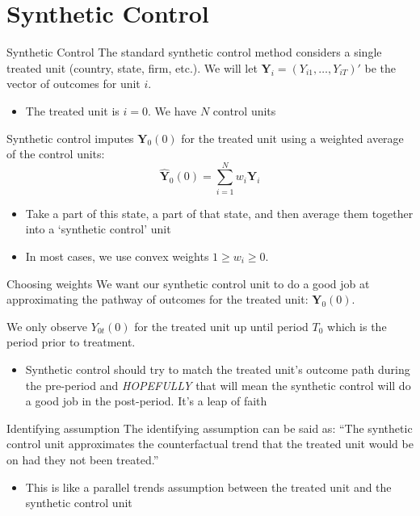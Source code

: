 \documentclass[aspectratio=169,t,11pt,table]{beamer}
\begin{document}
\section{Synthetic Control}

\begin{frame}{Synthetic Control}
  The standard synthetic control method considers a single treated unit (country, state, firm, etc.). We will let $\bm{Y}_i = \left( Y_{i1}, \dots, Y_{iT} \right)'$ be the vector of outcomes for unit $i$. 
  \begin{itemize}
    \item The treated unit is $i = 0$. We have $N$ control units
  \end{itemize}

  \bigskip\pause
  Synthetic control imputes $\bm{Y}_0(0)$ for the treated unit using a weighted average of the control units: 
  $$
    \hat{\bm{Y}}_0(0) = \sum_{i = 1}^N w_i \bm{Y}_i
  $$
  \begin{itemize}
    \item Take a part of this state, a part of that state, and then average them together into a `synthetic control' unit
    \item In most cases, we use convex weights $1 \geq w_i \geq 0$.
  \end{itemize}
\end{frame}


\begin{frame}{Choosing weights}
  We want our synthetic control unit to do a good job at approximating the pathway of outcomes for the treated unit: $\bm{Y}_0(0)$.

  \pause
  \bigskip
  We only observe $Y_{0t}(0)$ for the treated unit up until period $T_0$ which is the period prior to treatment. 
  \begin{itemize}
    \item Synthetic control should try to match the treated unit's outcome path during the pre-period and \emph{HOPEFULLY} that will mean the synthetic control will do a good job in the post-period. It's a leap of faith
  \end{itemize}
\end{frame}

\begin{frame}{Identifying assumption}
  The identifying assumption can be said as:
  ``The synthetic control unit approximates the counterfactual trend that the treated unit would be on had they not been treated.''

  \begin{itemize}
    \item This is like a parallel trends assumption between the treated unit and the synthetic control unit
  \end{itemize}
\end{frame}
\end{document}
